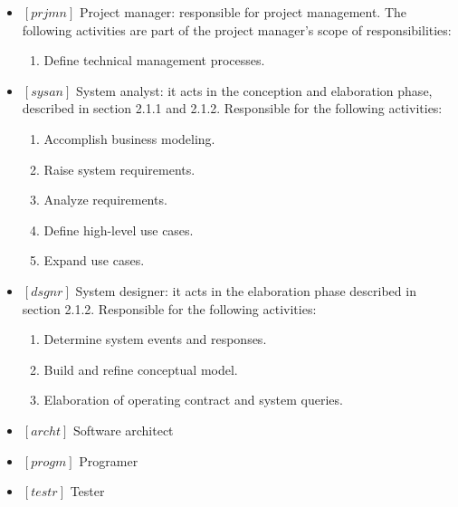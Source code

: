 \documentclass[11pt, twoside, a4paper]{book}
\begin{document}
        		\begin{itemize}
        		        			
        			\item $[prjmn]$ Project manager: responsible for project management. The following activities are part of the project manager's scope of responsibilities:
        			
						\begin{enumerate}
							\item Define technical management processes.						
						\end{enumerate}					        			
        			
        			\item $[sysan]$ System analyst: it acts in the conception and elaboration phase, described in section 2.1.1 and 2.1.2. Responsible for the following activities:
        				\begin{enumerate}
        					\item Accomplish business modeling.
        					\item Raise system requirements.
        					\item Analyze requirements.
        					\item Define high-level use cases.
        					\item Expand use cases.
        				\end{enumerate}
        		
        			\item $[dsgnr]$ System designer: it acts in the elaboration phase described in section 2.1.2. Responsible for the following activities:
        				\begin{enumerate}
        					\item Determine system events and responses.
        					\item Build and refine conceptual model.
        					\item Elaboration of operating contract and system queries.
        				\end{enumerate}
        			
        			\item $[archt]$ Software architect
        			
        			\item $[progm]$ Programer
        			
        			\item $[testr]$ Tester
        			
        		\end{itemize}
                
\end{document}
